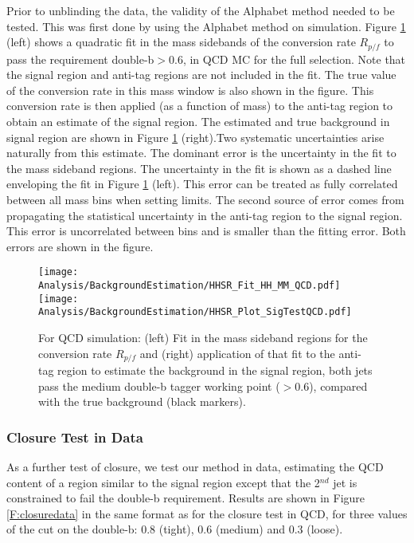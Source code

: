 Prior to unblinding the data, the validity of the Alphabet method needed to be tested. This was first done by using the Alphabet method on simulation. Figure \ref{F:closuresim} (left) shows a quadratic fit in the mass sidebands of the conversion rate $R_{p/f}$ to pass the requirement double-b$ > 0.6$, in QCD MC for the full selection. Note that the signal region and anti-tag regions are not included in the fit. The true value of the conversion rate in this mass window is also shown in the figure. This conversion rate is then applied (as a function of mass) to the anti-tag region to obtain an estimate of the signal region. The estimated and true background in signal region are shown in Figure \ref{F:closuresim} (right).Two systematic uncertainties arise naturally from this estimate. The dominant error is the uncertainty in the fit to the mass sideband regions. The uncertainty in the fit is shown as a dashed line enveloping the fit in Figure \ref{F:closuresim} (left). This error can be treated as fully correlated between all mass bins when setting limits. The second source of error comes from propagating the statistical uncertainty in the anti-tag region to the signal region. This error is uncorrelated between bins and is smaller than the fitting error. Both errors are shown in the figure.

\begin{figure}[H]
\centering
\texttt{[image: Analysis/BackgroundEstimation/HHSR\_Fit\_HH\_MM\_QCD.pdf]}
\texttt{[image: Analysis/BackgroundEstimation/HHSR\_Plot\_SigTestQCD.pdf]}\\
  \caption{For QCD simulation: (left) Fit in the mass sideband regions for the conversion rate $R_{p/f}$ and (right) application of that fit to the anti-tag region to estimate the background in the signal region, both jets pass the medium double-b tagger working point ($> 0.6$), compared with the true background (black markers).}
\label{F:closuresim}
\end{figure}

\subsubsection{Closure Test in Data}

As a further test of closure, we test our method in data, estimating the QCD content of a region similar to the signal region except that the 2$^{nd}$ jet is constrained to fail the double-b requirement. Results are shown in Figure \ref{F:closuredata} in the same format as for the closure test in QCD, for three values of the cut on the double-b: 0.8 (tight), 0.6 (medium) and 0.3 (loose).


